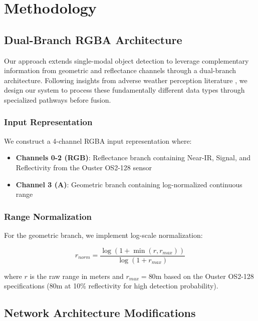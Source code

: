\documentclass[runningheads]{llncs}
\begin{document}
\section{Methodology}

\subsection{Dual-Branch RGBA Architecture}

Our approach extends single-modal object detection to leverage complementary information from geometric and reflectance channels through a dual-branch architecture. Following insights from adverse weather perception literature \cite{yang2025towards}, we design our system to process these fundamentally different data types through specialized pathways before fusion.

\subsubsection{Input Representation}

We construct a 4-channel RGBA input representation where:
\begin{itemize}
    \item \textbf{Channels 0-2 (RGB)}: Reflectance branch containing Near-IR, Signal, and Reflectivity from the Ouster OS2-128 sensor
    \item \textbf{Channel 3 (A)}: Geometric branch containing log-normalized continuous range
\end{itemize}

\subsubsection{Range Normalization}

For the geometric branch, we implement log-scale normalization:

\begin{equation}
r_{norm} = \frac{\log(1 + \min(r, r_{max}))}{\log(1 + r_{max})}
\end{equation}

where $r$ is the raw range in meters and $r_{max} = 80$m based on the Ouster OS2-128 specifications (80m at 10\% reflectivity for high detection probability).

\subsection{Network Architecture Modifications}
\end{document}
